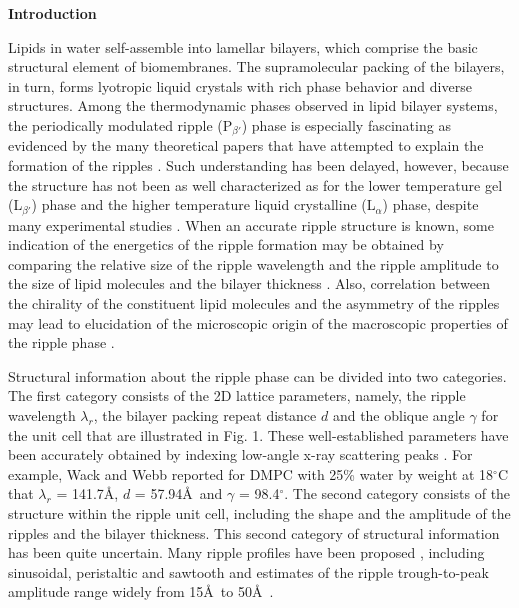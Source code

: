 
\vspace{0.128in}
\noindent
{\bf Introduction}
\vspace{0.128in}

Lipids in water self-assemble into lamellar bilayers, which comprise the basic
structural element of biomembranes.   The supramolecular packing of the
bilayers, in turn, forms lyotropic liquid crystals with rich phase behavior
and diverse structures.  Among the thermodynamic phases observed in
lipid bilayer systems, the periodically modulated ripple (P$_{\beta '}$) phase
is especially fascinating as evidenced by the many theoretical papers that
have attempted to explain the formation of the ripples
\cite{Don79,Mar84,Haw86,Car87,Gol88,McCu90,Hon91,Lub93}. 
Such understanding has been delayed, however, because the structure has
not been as well characterized as for the lower temperature gel
(L$_{\beta '}$) phase and the higher temperature liquid crystalline
(L$_{\alpha}$) phase, despite many experimental studies 
\cite{Tar73,JanSS79,Luna77,Ino80,Cop80,Sta82,Rup83,Ale85,Sir88,%
Wac89a,Kat95}.  When an accurate ripple
structure is known, some indication of the energetics of the ripple formation
may be obtained by comparing the relative size of the ripple
wavelength and the ripple amplitude to the size of lipid molecules and
the bilayer thickness \cite{Gol88}.  Also, correlation 
between the chirality of the constituent lipid molecules and the asymmetry of 
the ripples may lead to elucidation of the microscopic origin 
of the macroscopic properties of the ripple phase \cite{Lub93,Kat95}.

Structural information about the ripple phase can be divided into two
categories. The first category consists of the 2D lattice parameters, namely, 
the ripple wavelength $\lambda_r$, the bilayer packing repeat distance $d$ and
the oblique angle $\gamma$ for the unit cell that are illustrated
in Fig. 1.  These well-established parameters have been accurately
obtained by indexing low-angle x-ray scattering peaks
\cite{Tar73,JanSS79,Ino80,Ale85,Wac89a}. 
For example, Wack and Webb \cite{Wac89a} reported for DMPC with
25\% water by weight at 18$^{\circ}$C that $\lambda_r$ = 141.7\AA, $d$ = 57.94\AA\
and $\gamma$ = 98.4$^{\circ}$.  The second category
consists of the structure within the ripple unit cell, including
the shape and the amplitude of the ripples and the bilayer thickness. 
This second category of structural information
has been quite uncertain.  Many ripple profiles have been 
proposed \cite{Don79,Mar84,Car87,Gol88,McCu90,Hon91,Lub93,Tar73,JanSS79,Sta82},
including sinusoidal, peristaltic and sawtooth and
estimates of the ripple trough-to-peak 
amplitude range widely from 15\AA\ to 50\AA\ 
\cite{Tar73,JanSS79,Sta82,Zas88a,Hata93}.

